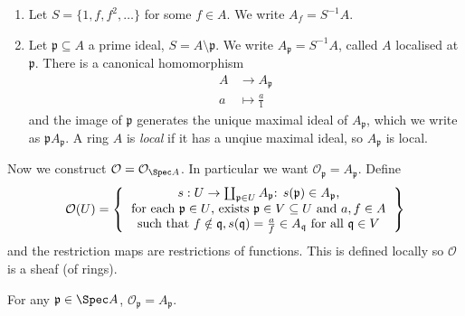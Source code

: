 \documentclass[a4paper]{article}
\newcommand{\sh}[1]{\mathcal{#1}} %
\begin{document}
\begin{eg}\leavevmode
  \begin{enumerate}
  \item Let \(S = \{1, f, f^2, \dots\}\) for some \(f \in A\). We write \(A_f = S^{-1}A\).
  \item Let \(\mathfrak p \subseteq A\) a prime ideal, \(S = A \setminus \mathfrak p\). We write \(A_{\mathfrak p} = S^{-1}A\), called \(A\) localised at \(\mathfrak p\). There is a canonical homomorphism
    \begin{align*}
      A &\to A_{\mathfrak p} \\
      a &\mapsto \frac{a}{1}
    \end{align*}
    and the image of \(\mathfrak p\) generates the unique maximal ideal of \(A_{\mathfrak p}\), which we write as \(\mathfrak p A_{\mathfrak p}\). A ring \(A\) is \emph{local} if it has a unqiue maximal ideal, so \(A_{\mathfrak p}\) is local.
  \end{enumerate}
\end{eg}

Now we construct \(\sh O = \mathcal O_{\Spec A}\). In particular we want \(\sh O_{\mathfrak p} = A_{\mathfrak p}\). Define
\[
  \sh O(U) =
  \left\{
    \begin{tabular}{c}
      \(s: U \to \coprod_{\mathfrak p \in U} A_{\mathfrak p}\): \(s(\mathfrak p) \in A_{\mathfrak p}\), \\
      for each \(\mathfrak p \in U\), exists \(\mathfrak p \in V \subseteq U\) and \(a, f \in A\) \\
      such that \(f \notin \mathfrak q, s(\mathfrak q) = \frac{a}{f} \in A_{\mathfrak q}\) for all \(\mathfrak q \in V\)
    \end{tabular}
  \right\}
\]
and the restriction maps are restrictions of functions. This is defined locally so \(\sh O\) is a sheaf (of rings).

\begin{proposition}
  For any \(\mathfrak p \in \Spec A\), \(\sh O_{\mathfrak p} = A_{\mathfrak p}\).
\end{proposition}
\end{document}
